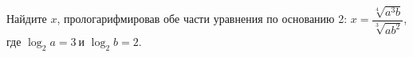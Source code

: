 \begin{ex}[type=equation]
	\begin{condition}
		Найдите $x$, прологарифмировав обе части уравнения по основанию 2: $x = \dfrac{\sqrt[4]{a^3 b}}{\sqrt[3]{ab^2}}$, где $\log_2 a = 3\ $и $\log_2 b = 2.$ 
	\end{condition}
\end{ex}